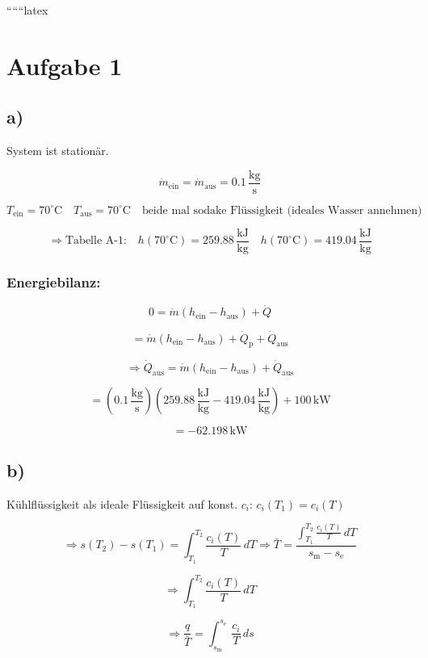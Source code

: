 
``````latex


\section*{Aufgabe 1}

\subsection*{a)}
System ist stationär.

\[
\dot{m}_{\text{ein}} = \dot{m}_{\text{aus}} = 0.1 \, \frac{\text{kg}}{\text{s}}
\]

\[
T_{\text{ein}} = 70^\circ \text{C} \quad T_{\text{aus}} = 70^\circ \text{C} \quad \text{beide mal sodake Flüssigkeit (ideales Wasser annehmen)}
\]

\[
\Rightarrow \text{Tabelle A-1:} \quad h(70^\circ \text{C}) = 259.88 \, \frac{\text{kJ}}{\text{kg}} \quad h(70^\circ \text{C}) = 419.04 \, \frac{\text{kJ}}{\text{kg}}
\]

\subsubsection*{Energiebilanz:}

\[
0 = \dot{m} (h_{\text{ein}} - h_{\text{aus}}) + \dot{Q}
\]

\[
= \dot{m} (h_{\text{ein}} - h_{\text{aus}}) + \dot{Q}_{\text{p}} + \dot{Q}_{\text{aus}}
\]

\[
\Rightarrow \dot{Q}_{\text{aus}} = \dot{m} (h_{\text{ein}} - h_{\text{aus}}) + \dot{Q}_{\text{aus}}
\]

\[
= \left( 0.1 \, \frac{\text{kg}}{\text{s}} \right) \left( 259.88 \, \frac{\text{kJ}}{\text{kg}} - 419.04 \, \frac{\text{kJ}}{\text{kg}} \right) + 100 \, \text{kW}
\]

\[
= -62.198 \, \text{kW}
\]

\subsection*{b)}
Kühlflüssigkeit als ideale Flüssigkeit auf konst. $c_i$: $c_i(T_1) = c_i(T)$

\[
\Rightarrow s(T_2) - s(T_1) = \int_{T_1}^{T_2} \frac{c_i(T)}{T} \, dT \Rightarrow \bar{T} = \frac{\int_{T_1}^{T_2} \frac{c_i(T)}{T} \, dT}{s_{\text{m}} - s_{\text{e}}}
\]

\[
\Rightarrow \int_{T_1}^{T_2} \frac{c_i(T)}{T} \, dT
\]

\[
\Rightarrow \frac{q}{\bar{T}} = \int_{s_{\text{m}}}^{s_{\text{e}}} \frac{c_i}{T} \, ds
\]

